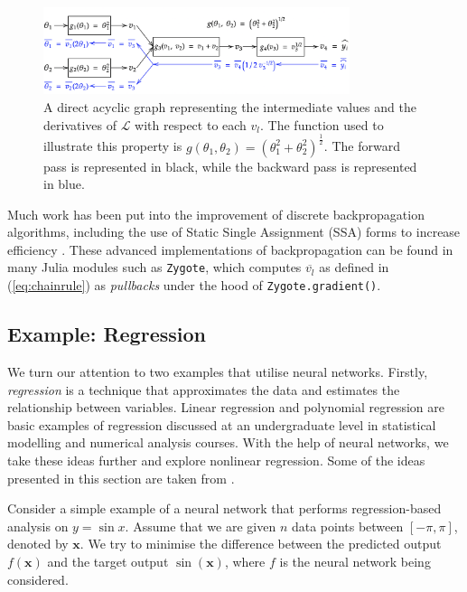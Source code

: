 \documentclass[a4paper,11pt,titlepage]{article}
\theoremstyle{definition}
\theoremstyle{plain}
\theoremstyle{remark}
\begin{document}
\begin{figure}[htbp]\label{discretebackprop}
    \centering
    \includegraphics[width=0.8\textwidth]{report/figures/backpropdiscrete.png}
    \caption{A direct acyclic graph representing the intermediate values and the derivatives of $\mathcal{L}$ with respect to each $v_l$. The function used to illustrate this property is $g(\theta_1, \theta_2) = (\theta_1^2 + \theta_2^2)^\frac{1}{2}$. The forward pass is represented in black, while the backward pass is represented in blue.}
    \label{fig:discretebackprop}
\end{figure}

Much work has been put into the improvement of discrete backpropagation algorithms, including the use of Static Single Assignment (SSA) forms to increase efficiency \cite{innes2019}. These advanced implementations of backpropagation can be found in many Julia modules such as \texttt{Zygote}, which computes $\overline{v_l}$ as defined in (\ref{eq:chainrule}) as \textit{pullbacks} under the hood of \texttt{Zygote.gradient()}.

\subsection{Example: Regression}
\label{sec:regex}

We turn our attention to two examples that utilise neural networks. Firstly, \textit{regression} is a technique that approximates the data and estimates the relationship between variables. Linear regression and polynomial regression are basic examples of regression discussed at an undergraduate level in statistical modelling and numerical analysis courses. With the help of neural networks, we take these ideas further and explore nonlinear regression. Some of the ideas presented in this section are taken from \cite{SciMLSANUM2024}.

Consider a simple example of a neural network that performs regression-based analysis on $y = \sin x$. Assume that we are given $n$ data points between $[-\pi, \pi]$, denoted by $\mathbf{x}$. We try to minimise the difference between the predicted output $f(\mathbf{x})$ and the target output $\sin (\mathbf{x})$, where $f$ is the neural network being considered.
\end{document}
